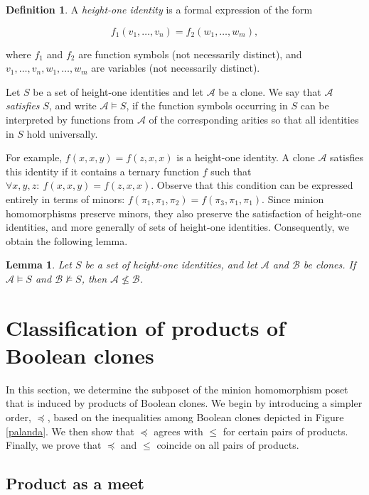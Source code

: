 \documentclass{amsart}
\numberwithin{equation}{section}
\theoremstyle{plain}
\newtheorem{lemma}[theorem]{Lemma}
\theoremstyle{definition}
\newtheorem{definition}[theorem]{Definition}
\def\clone#1{\mathcal{#1}}
\begin{document}
\begin{definition}
A {\em height-one identity} is a formal expression of the form

$$f_1(v_1,\dots,v_n)=f_2(w_1,\dots,w_m),$$

where $f_1$ and $f_2$ are function symbols (not necessarily distinct),
and $v_1,\dots,v_n,w_1,\dots,w_m$ are variables (not necessarily distinct).

Let $S$ be a set of height-one identities and let $\clone{A}$ be a clone.
We say that $\clone{A}$ {\em satisfies} $S$, and write
$\clone{A}\models S$, if the function symbols occurring in $S$ can be
interpreted by functions from $\clone{A}$ of the corresponding arities
so that all identities in $S$ hold universally.
\end{definition}

For example,
$f(x,x,y)=f(z,x,x)$
is a height-one identity. A clone $\clone{A}$ satisfies this identity if it
contains a ternary function $f$ such that
$\forall x,y,z\colon\ f(x,x,y)=f(z,x,x)$.
Observe that this condition can be expressed entirely in terms of minors:
$f(\pi_1,\pi_1,\pi_2)=f(\pi_3,\pi_1,\pi_1)$.
Since minion homomorphisms preserve minors, they also preserve the satisfaction
of height-one identities, and more generally of sets of height-one
identities. Consequently, we obtain the following lemma.

\begin{lemma}\label{identity-proof-strategy}
Let $S$ be a set of height-one identities, and let $\clone{A}$ and
$\clone{B}$ be clones. If
$\clone{A}\models S$
and
$\clone{B}\not\models S$,
then
$\clone{A}\not\leq \clone{B}$.
\end{lemma}

\section{Classification of products of Boolean clones}

In this section, we determine the subposet of the minion homomorphism poset that is
induced by products of Boolean clones. 
We begin by introducing a simpler order, $\preceq$, based on the inequalities among Boolean clones depicted in Figure \ref{palanda}. We then show that $\preceq$ agrees with $\leq$ for certain pairs of products. Finally, we prove that $\preceq$ and $\leq$ coincide on all pairs of products.


\subsection{Product as a meet}
\end{document}
